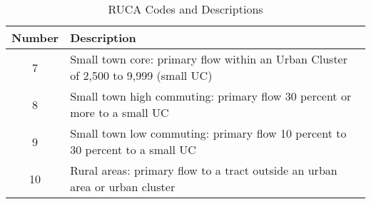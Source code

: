 \begin{table}[htbp]
    \centering
    \caption{RUCA Codes and Descriptions}
    \label{tab:ruca_descriptions}
    \begin{tabular}{|c|p{10cm}|}
        \hline
        \textbf{Number} & \textbf{Description} \\
        \hline
        7 & Small town core: primary flow within an Urban Cluster of 2,500 to 9,999 (small UC) \\
        \hline
        8 & Small town high commuting: primary flow 30 percent or more to a small UC \\
        \hline
        9 & Small town low commuting: primary flow 10 percent to 30 percent to a small UC \\
        \hline
        10 & Rural areas: primary flow to a tract outside an urban area or urban cluster \\
        \hline
    \end{tabular}
\end{table}
